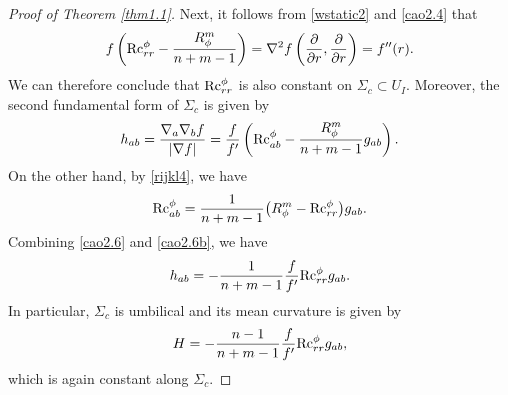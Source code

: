 \documentclass[10pt,a4paper]{amsart}
\numberwithin{equation}{section}
\begin{document}
\begin{proof}[Proof of Theorem \ref{thm1.1}]
Next, it follows from \eqref{wstatic2} and \eqref{cao2.4} that
\begin{equation}\label{cao2.4b}
 f\left({\rm Rc}^\phi_{rr}-\frac{R_\phi^m}{n+m-1}\right)=\nabla^2f\left(\frac{\partial}{\partial r},\frac{\partial}{\partial r}\right)=f''(r).
\end{equation}
We can therefore conclude that ${\rm Rc}^\phi_{rr}$ is also constant on $\Sigma_c\subset U_I$. Moreover, the second fundamental form of $\Sigma_c$ is given by
\begin{equation}\label{cao2.6}
 h_{ab}=\frac{\nabla_a\nabla_bf}{|\nabla f|}=\frac{f}{f'}\left({\rm Rc}^\phi_{ab}-\frac{R_\phi^m}{n+m-1}g_{ab}\right).
\end{equation}
On the other hand, by \eqref{rijkl4}, we have
\begin{equation}\label{cao2.6b}
 {\rm Rc}^\phi_{ab}=\frac{1}{n+m-1}\bigl(R_\phi^m-{\rm Rc}^\phi_{rr}\bigr)g_{ab}.
\end{equation}
Combining \eqref{cao2.6} and \eqref{cao2.6b}, we have
\begin{equation}\label{cao2.6c}
 h_{ab}=-\frac{1}{n+m-1}\frac{f}{f'}{\rm Rc}^\phi_{rr}g_{ab}.
\end{equation}
In particular, $\Sigma_c$ is umbilical and its mean curvature is given by
\begin{equation*}
 H=-\frac{n-1}{n+m-1}\frac{f}{f'}{\rm Rc}^\phi_{rr}g_{ab},
\end{equation*}
which is again constant along $\Sigma_c$.


\end{proof}
\end{document}
